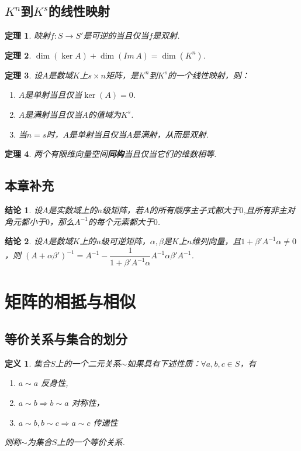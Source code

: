 \documentclass[UTF8]{article}
\newtheorem{thrm}{定理}[subsection]
\newtheorem{defn}{定义}[subsection]
\newtheorem{ccl}{结论}[subsection]
\begin{document}
\subsection{$K^n$到$K^s$的线性映射}
\begin{thrm}
  映射$f:S\rightarrow S'$是可逆的当且仅当$f$是双射.
\end{thrm}
\begin{thrm}
  $\dim(\ker A)+\dim(Im\,A)=\dim(K^n)$.
\end{thrm}
\begin{thrm}
  设$A$是数域$K$上$s\times n$矩阵，是$K^n$到$K^s$的一个线性映射，则：\\
  \begin{enumerate}
    \item $A$是单射当且仅当$\ker(A)=0$.
    \item $A$是满射当且仅当$A$的值域为$K^s$.
    \item 当$n=s$时，$A$是单射当且仅当$A$是满射，从而是双射.
  \end{enumerate}
\end{thrm}
\begin{thrm}
  两个有限维向量空间\textbf{同构}当且仅当它们的维数相等.
\end{thrm}

\subsection{本章补充}
\begin{ccl}
  设$A$是实数域上的$n$级矩阵，若$A$的所有顺序主子式都大于$0$,且所有非主对角元都小于$0$，那么$A^{-1}$的每个元素都大于$0$.
\end{ccl}
\begin{ccl}
  设$A$是数域$K$上的$n$级可逆矩阵，$\alpha,\beta$是$K$上$n$维列向量，且$1+\beta'A^{-1}\alpha \ne 0$，则
  $(A+\alpha\beta')^{-1}=A^{-1}-\dfrac{1}{1+\beta'A^{-1}\alpha}A^{-1}\alpha\beta'A^{-1}$.
\end{ccl}

\section{矩阵的相抵与相似}
\subsection{等价关系与集合的划分}
\begin{defn}
  集合$S$上的一个二元关系$\sim $如果具有下述性质：$\forall a,b,c\in S$，有
  \begin{enumerate}
    \item $a\sim a$ 反身性,
    \item $a\sim b\Rightarrow b\sim a$ 对称性，
    \item $a\sim b,b\sim c\Rightarrow a\sim c$ 传递性
  \end{enumerate}
  则称$\sim $为集合$S$上的一个等价关系.
\end{defn}
\end{document}
